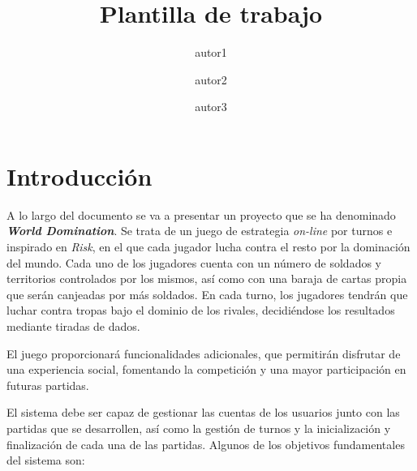 \documentclass[11pt, a4paper, titlepage]{article}
\title{Plantilla de trabajo}
\author{autor1 \and autor2 \and autor3}
\date{\monthyear}
\begin{document}
 


\begin{titlepage}

\thispagestyle{empty}


\end{titlepage}
\newpage





\thispagestyle{empty}
\fontsize{11pt}{11pt}\selectfont

\setcounter{tocdepth}{4}

{
    \hypersetup{linkcolor=black}
    \doublespacing
    \tableofcontents
}

\thispagestyle{empty}

\clearpage
\setcounter{page}{1}
\section{Introducción}
A lo largo del documento se va a presentar un proyecto que se ha denominado\textit{ \textbf{World Domination}}. Se trata de un juego de estrategia \textit{on-line} por turnos e inspirado en \textit{Risk}, en el que cada jugador lucha contra el resto por la dominación del mundo. Cada uno de los jugadores cuenta con un número de soldados y territorios controlados por los mismos, así como con una baraja de cartas propia que serán canjeadas por más soldados. En cada turno, los jugadores tendrán que luchar contra tropas bajo el dominio de los rivales, decidiéndose los resultados mediante tiradas de dados. \newline

El juego proporcionará funcionalidades adicionales, que permitirán disfrutar de una experiencia social, fomentando la competición y una mayor participación en futuras partidas. \newline

El sistema debe ser capaz de gestionar las cuentas de los usuarios junto con las partidas que se desarrollen, así como la gestión de turnos y la inicialización y finalización de cada una de las partidas. Algunos de los objetivos fundamentales del sistema son: 
\end{document}
